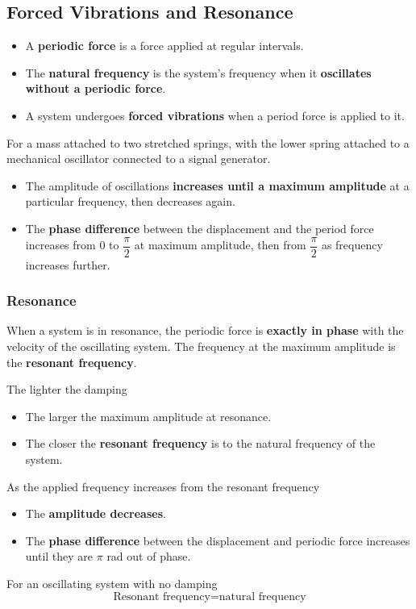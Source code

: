 \subsection{Forced Vibrations and Resonance}

\begin{itemize}
    \item A \textbf{periodic force} is a force applied at regular intervals.
    \item The \textbf{natural frequency} is the system's frequency when it \textbf{oscillates without a periodic force}.
    \item A system undergoes \textbf{forced vibrations} when a period force is applied to it.
\end{itemize}

For a mass attached to two stretched springs, with the lower spring attached to a mechanical oscillator connected to a signal generator.
\begin{itemize}
    \item The amplitude of oscillations \textbf{increases until a maximum amplitude} at a particular frequency, then decreases again.
    \item The \textbf{phase difference} between the displacement and the period force increases from 0 to $\dfrac{\pi}{2}$ at maximum amplitude, then from $\dfrac{\pi}{2}$ as frequency increases further.
\end{itemize}

\subsubsection*{Resonance}

When a system is in resonance, the periodic force is \textbf{exactly in phase} with the velocity of the oscillating system. The frequency at the maximum amplitude is the \textbf{resonant frequency}.

The lighter the damping
\begin{itemize}
    \item The larger the maximum amplitude at resonance.
    \item The closer the \textbf{resonant frequency} is to the natural frequency of the system.
\end{itemize}

As the applied frequency increases from the resonant frequency
\begin{itemize}
    \item The \textbf{amplitude decreases}.
    \item The \textbf{phase difference} between the displacement and periodic force increases until they are $\pi$ rad out of phase.
\end{itemize}

For an oscillating system with no damping
$$\text{Resonant frequency}=\text{natural frequency}$$
